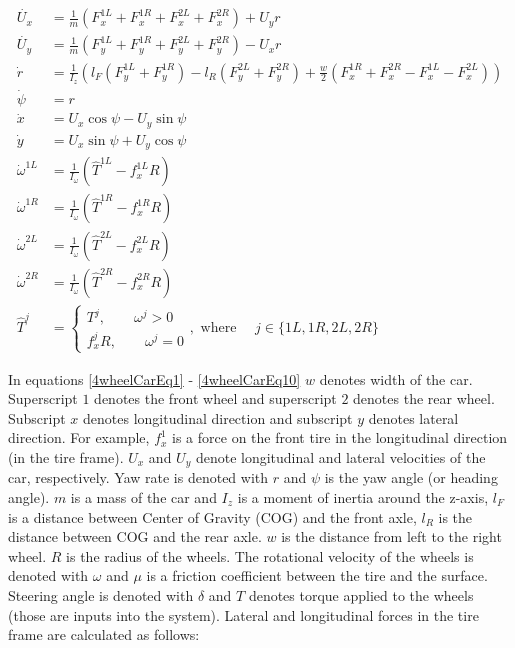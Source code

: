 \documentclass[paper=a4, fontsize=11pt]{scrartcl} %
\numberwithin{equation}{section} %
\numberwithin{figure}{section} %
\numberwithin{table}{section} %
\begin{document}
\begin{align}
\dot{{U_x}} &  = \frac{1}{m} \left( F_x^{1L} + F_x^{1R} + F_x^{2L} +F_x^{2R} \right) + U_yr \label{4wheelCarEq1}      \\
\dot{U_y}   & = \frac{1}{m} \left(F_y^{1L} + F_y^{1R} + F_y^{2L} + F_y^{2R}  \right)  - U_xr \\
\dot{r}  & = \frac{1}{I_z}  \left( l_F \left(F_y^{1L} + F_y^{1R} \right) -l_R \left(F_y^{2L} + F_y^{2R} \right) + \frac{w}{2}\left(F_x^{1R} + F_x^{2R} - F_x^{1L} - F_x^{2L} \right)    \right) \\
\dot{\psi}  & = r \\
\dot{x}  & = U_x\cos\psi - U_y\sin\psi \\
\dot{y}  & = U_x\sin\psi + U_y\cos\psi \\
\dot{\omega}^{1L}  & = \frac{1}{I_{\omega}}\left( \hat{T}^{1L} - f_x^{1L}R\right)  \\
\dot{\omega}^{1R}  & = \frac{1}{I_{\omega}}\left( \hat{T}^{1R} - f_x^{1R}R\right) \\ 
\dot{\omega}^{2L}  & = \frac{1}{I_{\omega}}\left( \hat{T}^{2L} - f_x^{2L}R\right)  \\
\dot{\omega}^{2R}  & = \frac{1}{I_{\omega}}\left( \hat{T}^{2R} - f_x^{2R}R\right) \label{4wheelCarEq10} \\ 
\hat{T}^j& = \begin{cases}   T^j, \qquad \omega^j > 0 \\
f_x^jR, \qquad \omega^j = 0 
\end{cases}, \text{ where } \quad j \in \{1L, 1R, 2L, 2R \} \label{discontinuous}
\end{align}

In equations \ref{4wheelCarEq1} - \ref{4wheelCarEq10} $w$ denotes width of the car. Superscript $1$ denotes the front wheel and superscript $2$ denotes the rear wheel. Subscript $x$ denotes longitudinal direction and subscript $y$ denotes lateral direction. For example, $f^1_x$ is a force on the front tire in the longitudinal direction (in the tire frame). $U_x$ and $U_y$ denote longitudinal and lateral velocities of the car, respectively. Yaw rate is denoted with $r$ and $\psi$ is the yaw angle (or heading angle). $m$ is a mass of the car and $I_z$ is a moment of inertia around the z-axis, $l_F$ is a distance between Center of Gravity (COG) and the front axle, $l_R$ is the distance between COG and the rear axle. $w$ is the distance from left to the right wheel. $R$ is the radius of the wheels. The rotational velocity of the wheels is denoted with $\omega$ and $\mu$ is a friction coefficient between the tire and the surface. Steering angle is denoted with $\delta$ and $T$ denotes torque applied to the wheels (those are inputs into the system). Lateral and longitudinal forces in the tire frame are calculated as follows:
\end{document}
